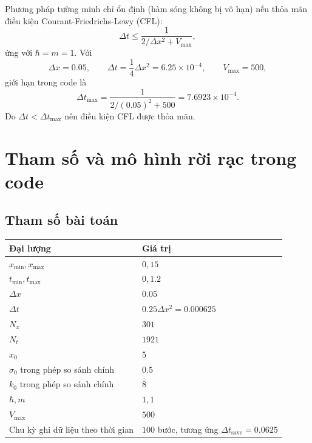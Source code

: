 \documentclass[12pt,a4paper]{article}
\begin{document}
Phương pháp tường minh chỉ ổn định (hàm sóng không bị vô hạn) nếu thỏa mãn
điều kiện Courant-Friedrichs-Lewy (CFL):
\begin{equation}
    \Delta t\leq \frac{1}{2/\Delta x^2+V_{\max}},
    \label{eq:cflcode}
\end{equation}
ứng với $\hbar=m=1$. Với
\[
    \Delta x=0.05,\qquad
    \Delta t=\frac{1}{4}\Delta x^2=6.25\times10^{-4},\qquad
    V_{\max}=500,
\]
giới hạn trong code là
\begin{equation}
    \Delta t_{\max}=\frac{1}{2/(0.05)^2+500}
    =7.6923\times10^{-4}.
\end{equation}
Do $\Delta t<\Delta t_{\max}$ nên điều kiện CFL được thỏa mãn.

\section{Tham số và mô hình rời rạc trong code}

\subsection{Tham số bài toán}

\begin{center}
\begin{tabular}{@{}ll@{}}
\toprule
\textbf{Đại lượng} & \textbf{Giá trị} \\
\midrule
$x_{\min},x_{\max}$ & $0,15$ \\
$t_{\min},t_{\max}$ & $0,1.2$ \\
$\Delta x$ & $0.05$ \\
$\Delta t$ & $0.25\Delta x^2=0.000625$ \\
$N_x$ & $301$ \\
$N_t$ & $1921$ \\
$x_0$ & $5$ \\
$\sigma_0$ trong phép so sánh chính & $0.5$ \\
$k_0$ trong phép so sánh chính & $8$ \\
$\hbar,m$ & $1,1$ \\
$V_{\max}$ & $500$ \\
Chu kỳ ghi dữ liệu theo thời gian & $100$ bước, tương ứng $\Delta t_{\mathrm{save}}=0.0625$ \\
\bottomrule
\end{tabular}
\end{center}
\end{document}
